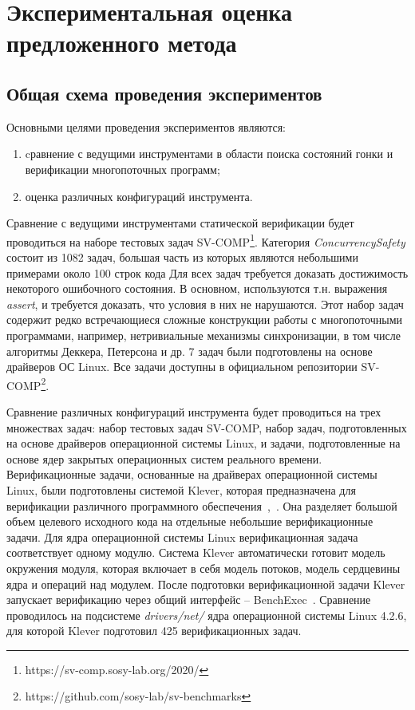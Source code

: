 \chapter{Экспериментальная оценка предложенного метода}
\label{chapter_evaluation}

\newcommand{\theory}{CPALockator-Reach}
\newcommand{\theoryraces}{CPALockator-TM}
\newcommand{\combatmode}{CPALockator-Inv}

\section{Общая схема проведения экспериментов}

Основными целями проведения экспериментов являются:
\begin{enumerate}
\item cравнение с ведущими инструментами в области поиска состояний гонки и верификации многопоточных программ;
\item оценка различных конфигураций инструмента.
\end{enumerate}

Сравнение с ведущими инструментами статической верификации будет проводиться на наборе тестовых задач SV-COMP\footnote{https://sv-comp.sosy-lab.org/2020/}.
Категория {\em ConcurrencySafety} состоит из 1082 задач, большая часть из которых являются небольшими примерами около 100 строк кода
Для всех задач требуется доказать достижимость некоторого ошибочного состояния. 
В основном, используются т.н. выражения \textit{assert}, и требуется доказать, что условия в них не нарушаются. 
Этот набор задач содержит редко встречающиеся сложные конструкции работы с многопоточными программами, например, нетривиальные механизмы синхронизации, в том числе алгоритмы Деккера, Петерсона и др.
7 задач были подготовлены на основе драйверов ОС Linux. Все задачи доступны в официальном репозитории SV-COMP\footnote{https://github.com/sosy-lab/sv-benchmarks}.

Сравнение различных конфигураций инструмента будет проводиться на трех множествах задач: набор тестовых задач SV-COMP, набор задач, подготовленных на основе драйверов операционной системы Linux, и задачи, подготовленные на основе ядер закрытых операционных систем реального времени.
Верификационные задачи, основанные на драйверах операционной системы Linux, были подготовлены системой Klever, которая предназначена для верификации различного программного обеспечения~\cite{kleverPsi},~\cite{kleverIsola}.
Она разделяет большой объем целевого исходного кода на отдельные небольшие верификационные задачи.
Для ядра операционной системы Linux верификационная задача соответствует одному модулю.
Система Klever автоматически готовит модель окружения модуля, которая включает в себя модель потоков, модель сердцевины ядра и операций над модулем.
После подготовки верификационной задачи Klever запускает верификацию через общий интерфейс -- BenchExec~\cite{benchexec2019}.
Сравнение проводилось на подсистеме \textit{drivers/net/} ядра операционной системы Linux 4.2.6, для которой Klever подготовил 425 верификационных задач.

